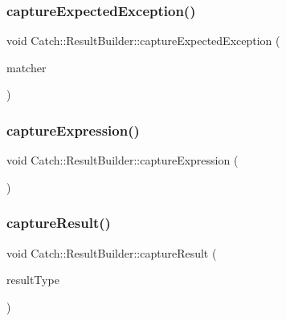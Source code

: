 \hypertarget{class_catch_1_1_result_builder_a7d443d632eaeabe2cb36218b8dcb7400}{}\label{class_catch_1_1_result_builder_a7d443d632eaeabe2cb36218b8dcb7400} 
\subsubsection{\texorpdfstring{capture\+Expected\+Exception()}{captureExpectedException()}\hspace{0.1cm}{\footnotesize\ttfamily [2/2]}}
{\footnotesize\ttfamily void Catch\+::\+Result\+Builder\+::capture\+Expected\+Exception (\begin{DoxyParamCaption}\item[{\hyperlink{struct_catch_1_1_matchers_1_1_impl_1_1_matcher}{Matchers\+::\+Impl\+::\+Matcher}$<$ std\+::string $>$ const \&}]{matcher }\end{DoxyParamCaption})}

\hypertarget{class_catch_1_1_result_builder_af2ae2343965802eeeb0abbd4ea9d2d36}{}\label{class_catch_1_1_result_builder_af2ae2343965802eeeb0abbd4ea9d2d36} 
\subsubsection{\texorpdfstring{capture\+Expression()}{captureExpression()}}
{\footnotesize\ttfamily void Catch\+::\+Result\+Builder\+::capture\+Expression (\begin{DoxyParamCaption}{ }\end{DoxyParamCaption})}

\hypertarget{class_catch_1_1_result_builder_a10e467f7b7a4976e5d148b4d5066e8fd}{}\label{class_catch_1_1_result_builder_a10e467f7b7a4976e5d148b4d5066e8fd} 
\subsubsection{\texorpdfstring{capture\+Result()}{captureResult()}}
{\footnotesize\ttfamily void Catch\+::\+Result\+Builder\+::capture\+Result (\begin{DoxyParamCaption}\item[{\hyperlink{struct_catch_1_1_result_was_a624e1ee3661fcf6094ceef1f654601ef}{Result\+Was\+::\+Of\+Type}}]{result\+Type }\end{DoxyParamCaption})}

